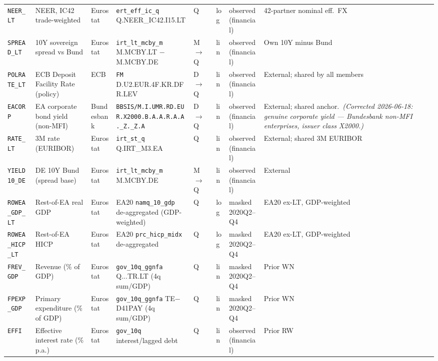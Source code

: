 {\begin{longtable}{@{}p{1.9cm}p{2.9cm}p{1.5cm}p{2.7cm}p{0.7cm}p{1.0cm}p{1.6cm}p{2.4cm}@{}}
\texttt{NEER\_LT}     & NEER, IC42 trade-weighted         & Eurostat & \texttt{ert\_eff\_ic\_q} Q.NEER\_IC42.I15.LT           & Q & log & observed (financial) & 42-partner nominal eff.\ FX \\
\texttt{SPREAD\_LT}   & 10Y sovereign spread vs Bund      & Eurostat & \texttt{irt\_lt\_mcby\_m} M.MCBY.LT $-$ M.MCBY.DE      & M$\to$Q & lin & observed (financial) & Own 10Y minus Bund \\
\texttt{POLRATE\_LT}  & ECB Deposit Facility Rate (policy) & ECB & \texttt{FM} D.\allowbreak U2.\allowbreak EUR.\allowbreak 4F.\allowbreak KR.\allowbreak DFR.\allowbreak LEV                     & D$\to$Q & lin & observed (financial) & External; shared by all members \\
\texttt{EACORP}       & EA corporate bond yield (non-MFI)  & Bundesbank & \texttt{BBSIS/\allowbreak M.\allowbreak I.\allowbreak UMR.\allowbreak RD.\allowbreak EUR.\allowbreak X2000.\allowbreak B.A.A.\allowbreak R.A.A.\allowbreak \_Z.\_Z.A}       & D$\to$Q & lin & observed (financial) & External; shared anchor.\ \textit{(Corrected 2026-06-18: genuine corporate yield --- Bundesbank non-MFI enterprises, issuer class X2000.)} \\
\texttt{RATE\_LT}     & 3M rate (EURIBOR)                 & Eurostat & \texttt{irt\_st\_q} Q.IRT\_M3.EA                       & Q & lin & observed (financial) & External; shared 3M EURIBOR \\
\texttt{YIELD10\_DE}  & DE 10Y Bund (spread base)         & Eurostat & \texttt{irt\_lt\_mcby\_m} M.MCBY.DE                    & M$\to$Q & lin & observed (financial) & External \\
\texttt{ROWEA\_GDP\_LT} & Rest-of-EA real GDP             & Eurostat & EA20 \texttt{namq\_10\_gdp} de-aggregated (GDP-weighted) & Q & log & masked 2020Q2--Q4 & EA20 ex-LT, GDP-weighted \\
\texttt{ROWEA\_HICP\_LT} & Rest-of-EA HICP               & Eurostat & EA20 \texttt{prc\_hicp\_midx} de-aggregated            & Q & log & masked 2020Q2--Q4 & EA20 ex-LT, GDP-weighted \\
\texttt{FREV\_GDP}    & Revenue (\% of GDP)               & Eurostat & \texttt{gov\_10q\_ggnfa} Q...TR.LT (4q sum/GDP)        & Q & lin & masked 2020Q2--Q4 & Prior WN \\
\texttt{FPEXP\_GDP}   & Primary expenditure (\% of GDP)   & Eurostat & \texttt{gov\_10q\_ggnfa} TE$-$D41PAY (4q sum/GDP)      & Q & lin & masked 2020Q2--Q4 & Prior WN \\
\texttt{EFFI}         & Effective interest rate (\% p.a.) & Eurostat & \texttt{gov\_10q} interest/lagged debt                 & Q & lin & observed (financial) & Prior RW \\

\end{longtable}}
